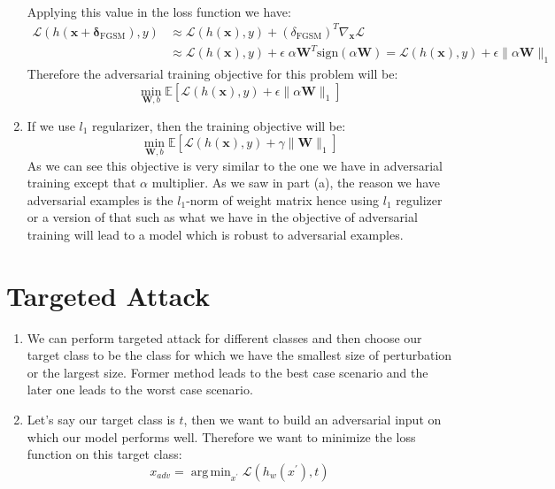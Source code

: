 \documentclass[12]{article}
\newcommand{\myskip}{0.7em}
\newcommand{\E}{{\mathbb E}}
\DeclareMathOperator*{\argmin}{arg\,min}
\begin{document}
\begin{enumerate}[label=\textbf{(\alph*)}]
\[\begin{aligned}
		\end{aligned}
		\]
		Applying this value in the loss function we have:
		\[
		\begin{aligned}
			\mathcal{L}(h(\bm{x}+\bm{\delta}_\text{FGSM}), y) &\approx \mathcal{L}(h(\bm{x}), y) + (\delta_\text{FGSM})^T\nabla_{\bm{x}}\mathcal{L} \\[\myskip]
				&\approx \mathcal{L}(h(\bm{x}), y) + \epsilon\; \alpha\bm{W}^T\text{sign}(\alpha\bm{W}) =\mathcal{L}(h(\bm{x}), y) + \epsilon\|\alpha\bm{W}\|_1
		\end{aligned}
		\]
		Therefore the adversarial training objective for this problem will be:
		\[
		\min_{\bm{W}, b} \E\left[\mathcal{L}(h(\bm{x}), y) + \epsilon\|\alpha\bm{W}\|_1\right]
		\]
		\item
		If we use $l_1$ regularizer, then the training objective will be:
		\[
		\min_{\bm{W}, b} \E\left[\mathcal{L}(h(\bm{x}), y) + \gamma\|\bm{W}\|_1\right]
		\]
		As we can see this objective is very similar to the one we have in adversarial training except that $\alpha$ multiplier. As we saw in part (a), the reason we have adversarial examples is the $l_1$-norm of weight matrix hence using $l_1$ regulizer or a version of that such as what we have in the objective of adversarial training will lead to a model which is robust to adversarial examples.
	\end{enumerate}

	\pagebreak
	\section{Targeted Attack}
	\begin{enumerate}[label=\textbf{(\alph*)}]
		\item We can perform targeted attack for different classes and then choose our target class to be the class for which we have the smallest size of perturbation or the largest size. Former method leads to the best case scenario and the later one leads to the worst case scenario. 
		\item
		Let's say our target class is $t$, then we want to build an adversarial input on which our model performs well. Therefore we want to minimize the loss function on this target class:
		\[
		x_{adv} = \argmin_{x^\prime} \mathcal{L}(h_w(x^\prime), t)
		\]
	\end{enumerate}

	\pagebreak
\end{document}
